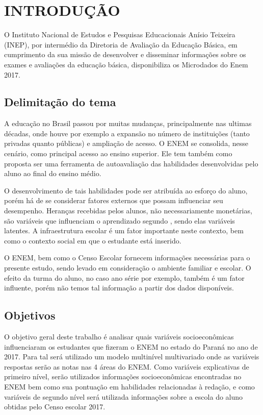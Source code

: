 \chapter[INTRODUÇÃO]{INTRODUÇÃO}   %

O Instituto Nacional de Estudos e Pesquisas Educacionais Anísio Teixeira (INEP), por intermédio da Diretoria de Avaliação da Educação Básica, em cumprimento da sua missão de desenvolver e disseminar informações sobre os exames e avaliações da educação básica, disponibiliza os Microdados do Enem 2017.

\section{Delimitação do tema}

A educação no Brasil passou por muitas mudanças, principalmente nas ultimas décadas, onde houve por exemplo a expansão no número de instituições (tanto privadas quanto públicas) e ampliação de acesso. O ENEM se consolida, nesse cenário, como principal acesso ao ensino superior. Ele tem também como proposta ser uma ferramenta de autoavaliação das habilidades desenvolvidas pelo aluno ao final do ensino médio. 

O desenvolvimento de tais habilidades pode ser atribuída ao esforço do aluno, porém há de se considerar fatores externos que possam influenciar seu desempenho. Heranças recebidas pelos alunos, não necessariamente monetárias, são variáveis que influenciam o aprendizado segundo  , sendo elas variáveis latentes. A infraestrutura escolar é um fator importante neste contexto, bem como o contexto social em que o estudante está inserido.

O ENEM, bem como o Censo Escolar fornecem informações necessárias para o presente estudo, sendo levado em consideração o ambiente familiar e escolar. O efeito da turma do aluno, no caso ano série por exemplo, também é um fator influente, porém não temos tal informação a partir dos dados disponíveis.

\section{Objetivos}

O objetivo geral deste trabalho é analisar quais variáveis socioeconômicas influenciaram os estudantes que fizeram o ENEM no estado do Paraná no ano de 2017. Para tal será utilizado um modelo multinível multivariado onde as variáveis respostas serão as notas nas 4 áreas do ENEM. Como variáveis explicativas de primeiro nível, serão utilizados informações socioeconômicas encontradas no ENEM bem como sua pontuação em habilidades relacionadas à redação, e como variáveis de segundo nível será utilizada informações sobre a escola do aluno obtidas pelo Censo escolar 2017.
